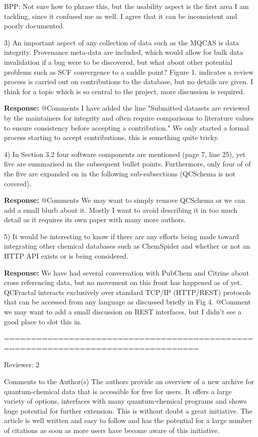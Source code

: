 BPP: Not sure how to phrase this, but the usability aspect is the first area I am tackling, since it confused me as well. I agree that it can be inconsistent and poorly documented.

3) An important aspect of any collection of data such as the MQCAS is data
integrity.  Provenance meta-data are included, which would allow for bulk data
invalidation if a bug were to be discovered, but what about other potential
problems such as SCF convergence to a saddle point?  Figure 1.  indicates a
review process is carried out on contributions to the database, but no details
are given.  I think for a topic which is so central to the project, more
discussion is required.

\textbf{Response:} @Comments I have added the line "Submitted datasets are reviewed by the \mqcas maintainers for integrity and often require comparisons to literature values to ensure consistency before accepting a contribution." We only started a formal process starting to accept contributions, this is something quite tricky.

4) In Section 3.2 four software components are mentioned (page 7, line 25), yet 
five are summarised in the subsequent bullet points.  Furthermore, only four of
of the five are expanded on in the following sub-subsections (QCSchema is not 
covered).

\textbf{Response:} @Comments We may want to simply remove QCSchema or we can add a small blurb about it. Mostly I want to avoid describing it in too much detail as it requires its own paper with many more authors.

5) It would be interesting to know if there are any efforts being made toward
integrating other chemical databases such as ChemSpider and whether or not 
an HTTP API exists or is being considered.

\textbf{Response:} We have had several conversation with PubChem and Citrine about cross referencing data, but no movement on this front has happened as of yet. QCFractal interacts exclusively over standard TCP/IP (HTTP/REST) protocols that can be accessed from any language as discussed briefly in Fig 4. 
@Comment we may want to add a small discussion on REST interfaces, but I didn't see a good place to slot this in.

==================================================================================

Reviewer: 2

Comments to the Author(s) 
The authors provide an overview of a new archive for quantum-chemical data that is accessible for free for users. It offers a large variety of options, interfaces with many quantum-chemical programs and shows huge potential for further extension. This is without doubt a great initiative. The article is well written and easy to follow and has the potential for a large number of citations as soon as more users have become aware of this initiative. 

